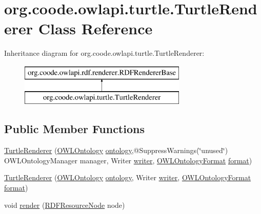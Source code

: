 \hypertarget{classorg_1_1coode_1_1owlapi_1_1turtle_1_1_turtle_renderer}{\section{org.\-coode.\-owlapi.\-turtle.\-Turtle\-Renderer Class Reference}
\label{classorg_1_1coode_1_1owlapi_1_1turtle_1_1_turtle_renderer}
}
Inheritance diagram for org.\-coode.\-owlapi.\-turtle.\-Turtle\-Renderer\-:\begin{figure}[H]
\begin{center}
\leavevmode
\includegraphics[height=2.000000cm]{classorg_1_1coode_1_1owlapi_1_1turtle_1_1_turtle_renderer}
\end{center}
\end{figure}
\subsection*{Public Member Functions}
\begin{DoxyCompactItemize}
\item 
\hyperlink{classorg_1_1coode_1_1owlapi_1_1turtle_1_1_turtle_renderer_a6153545923434a4db0d4a31af090465f}{Turtle\-Renderer} (\hyperlink{interfaceorg_1_1semanticweb_1_1owlapi_1_1model_1_1_o_w_l_ontology}{O\-W\-L\-Ontology} \hyperlink{classorg_1_1coode_1_1owlapi_1_1rdf_1_1renderer_1_1_r_d_f_renderer_base_a1c2e169e03ca2cdf866ca19387b258e4}{ontology},@Suppress\-Warnings(\char`\"{}unused\char`\"{}) O\-W\-L\-Ontology\-Manager manager, Writer \hyperlink{classorg_1_1coode_1_1owlapi_1_1turtle_1_1_turtle_renderer_ada152bf6e16e8c3ecf222bc9da398f30}{writer}, \hyperlink{classorg_1_1semanticweb_1_1owlapi_1_1model_1_1_o_w_l_ontology_format}{O\-W\-L\-Ontology\-Format} \hyperlink{classorg_1_1coode_1_1owlapi_1_1turtle_1_1_turtle_renderer_a7c87ae8c5ff0f557fead87e1e456a7ce}{format})
\item 
\hyperlink{classorg_1_1coode_1_1owlapi_1_1turtle_1_1_turtle_renderer_a3ba88046b647daca3d0898672a3773f4}{Turtle\-Renderer} (\hyperlink{interfaceorg_1_1semanticweb_1_1owlapi_1_1model_1_1_o_w_l_ontology}{O\-W\-L\-Ontology} \hyperlink{classorg_1_1coode_1_1owlapi_1_1rdf_1_1renderer_1_1_r_d_f_renderer_base_a1c2e169e03ca2cdf866ca19387b258e4}{ontology}, Writer \hyperlink{classorg_1_1coode_1_1owlapi_1_1turtle_1_1_turtle_renderer_ada152bf6e16e8c3ecf222bc9da398f30}{writer}, \hyperlink{classorg_1_1semanticweb_1_1owlapi_1_1model_1_1_o_w_l_ontology_format}{O\-W\-L\-Ontology\-Format} \hyperlink{classorg_1_1coode_1_1owlapi_1_1turtle_1_1_turtle_renderer_a7c87ae8c5ff0f557fead87e1e456a7ce}{format})
\item 
void \hyperlink{classorg_1_1coode_1_1owlapi_1_1turtle_1_1_turtle_renderer_a44c0127fa95f519200bae27f80beac5f}{render} (\hyperlink{classorg_1_1coode_1_1owlapi_1_1rdf_1_1model_1_1_r_d_f_resource_node}{R\-D\-F\-Resource\-Node} node)
\end{DoxyCompactItemize}
